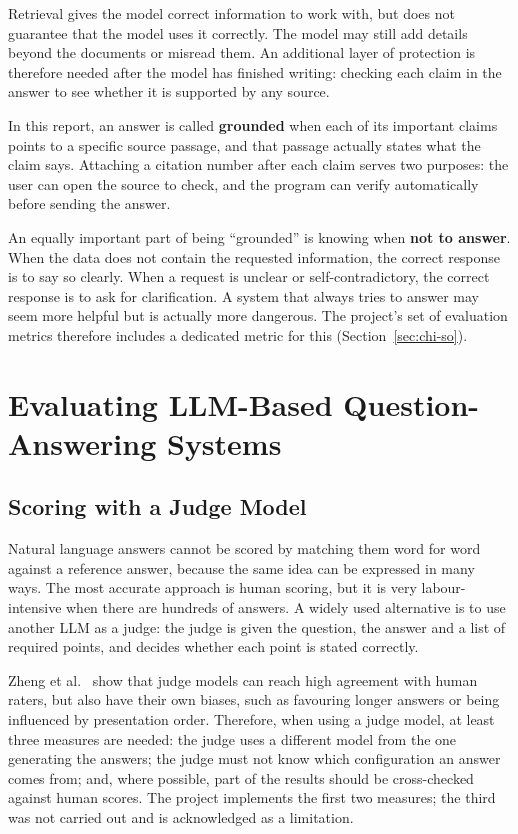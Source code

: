 Retrieval gives the model correct information to work with, but does not guarantee that the model uses it correctly. The model may still add details beyond the documents or misread them. An additional layer of protection is therefore needed after the model has finished writing: checking each claim in the answer to see whether it is supported by any source.

In this report, an answer is called \textbf{grounded} when each of its important claims points to a specific source passage, and that passage actually states what the claim says. Attaching a citation number after each claim serves two purposes: the user can open the source to check, and the program can verify automatically before sending the answer.

An equally important part of being ``grounded'' is knowing when \textbf{not to answer}. When the data does not contain the requested information, the correct response is to say so clearly. When a request is unclear or self-contradictory, the correct response is to ask for clarification. A system that always tries to answer may seem more helpful but is actually more dangerous. The project's set of evaluation metrics therefore includes a dedicated metric for this (Section~\ref{sec:chi-so}).

\section{Evaluating LLM-Based Question-Answering Systems}

\subsection{Scoring with a Judge Model}

Natural language answers cannot be scored by matching them word for word against a reference answer, because the same idea can be expressed in many ways. The most accurate approach is human scoring, but it is very labour-intensive when there are hundreds of answers. A widely used alternative is to use another LLM as a judge: the judge is given the question, the answer and a list of required points, and decides whether each point is stated correctly.

Zheng et al.\  show that judge models can reach high agreement with human raters, but also have their own biases, such as favouring longer answers or being influenced by presentation order. Therefore, when using a judge model, at least three measures are needed: the judge uses a different model from the one generating the answers; the judge must not know which configuration an answer comes from; and, where possible, part of the results should be cross-checked against human scores. The project implements the first two measures; the third was not carried out and is acknowledged as a limitation.

